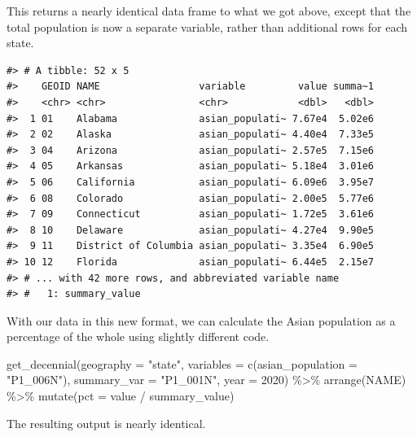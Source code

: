 \documentclass[
]{book}
\newenvironment{Shaded}{\begin{snugshade}}{\end{snugshade}}
\newcommand{\AttributeTok}[1]{\textcolor[rgb]{0.77,0.63,0.00}{#1}}
\newcommand{\DecValTok}[1]{\textcolor[rgb]{0.00,0.00,0.81}{#1}}
\newcommand{\FunctionTok}[1]{\textcolor[rgb]{0.00,0.00,0.00}{#1}}
\newcommand{\NormalTok}[1]{#1}
\newcommand{\SpecialCharTok}[1]{\textcolor[rgb]{0.00,0.00,0.00}{#1}}
\newcommand{\StringTok}[1]{\textcolor[rgb]{0.31,0.60,0.02}{#1}}
\begin{document}
This returns a nearly identical data frame to what we got above, except that the total population is now a separate variable, rather than additional rows for each state.

\begin{verbatim}
#> # A tibble: 52 x 5
#>    GEOID NAME                 variable         value summa~1
#>    <chr> <chr>                <chr>            <dbl>   <dbl>
#>  1 01    Alabama              asian_populati~ 7.67e4  5.02e6
#>  2 02    Alaska               asian_populati~ 4.40e4  7.33e5
#>  3 04    Arizona              asian_populati~ 2.57e5  7.15e6
#>  4 05    Arkansas             asian_populati~ 5.18e4  3.01e6
#>  5 06    California           asian_populati~ 6.09e6  3.95e7
#>  6 08    Colorado             asian_populati~ 2.00e5  5.77e6
#>  7 09    Connecticut          asian_populati~ 1.72e5  3.61e6
#>  8 10    Delaware             asian_populati~ 4.27e4  9.90e5
#>  9 11    District of Columbia asian_populati~ 3.35e4  6.90e5
#> 10 12    Florida              asian_populati~ 6.44e5  2.15e7
#> # ... with 42 more rows, and abbreviated variable name
#> #   1: summary_value
\end{verbatim}

With our data in this new format, we can calculate the Asian population as a percentage of the whole using slightly different code.

\begin{Shaded}
\begin{Highlighting}[]
\FunctionTok{get\_decennial}\NormalTok{(}\AttributeTok{geography =} \StringTok{"state"}\NormalTok{, }
              \AttributeTok{variables =} \FunctionTok{c}\NormalTok{(}\AttributeTok{asian\_population =} \StringTok{"P1\_006N"}\NormalTok{),}
              \AttributeTok{summary\_var =} \StringTok{"P1\_001N"}\NormalTok{,}
              \AttributeTok{year =} \DecValTok{2020}\NormalTok{) }\SpecialCharTok{\%\textgreater{}\%} 
  \FunctionTok{arrange}\NormalTok{(NAME) }\SpecialCharTok{\%\textgreater{}\%} 
  \FunctionTok{mutate}\NormalTok{(}\AttributeTok{pct =}\NormalTok{ value }\SpecialCharTok{/}\NormalTok{ summary\_value)}
\end{Highlighting}
\end{Shaded}

The resulting output is nearly identical.
\end{document}
